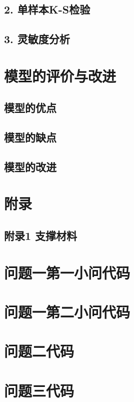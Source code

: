 \documentclass[12pt]{ctexart}
\begin{document}
	\subsection*{2. 单样本K-S检验}
	\subsection*{3. 灵敏度分析}
	
	\section{模型的评价与改进}
	\subsection{模型的优点}
	\subsection{模型的缺点}
	\subsection{模型的改进}
	
	\newpage
	\begin{thebibliography}{9}
		
	\end{thebibliography}
	
	\newpage
	\section*{附录}
	\subsection*{附录1 支撑材料}
	
	\newpage
	\section{问题一第一小问代码}
	
	\section{问题一第二小问代码}
	
	\section{问题二代码}
	
	\section{问题三代码}
	
	
	
\end{document}
